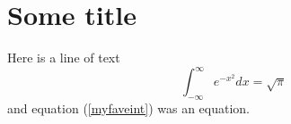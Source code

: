 \documentclass{article}
\begin{document}
\section{Some title}

Here is a line of text
\begin{equation}
\int_{-\infty}^\infty e^{-x^2} dx = \sqrt\pi
\label{myfaveint}
\end{equation}
and equation (\ref{myfaveint}) was an equation.
\end{document}
